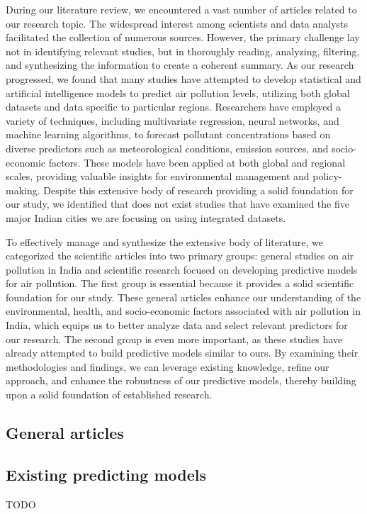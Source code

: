 \documentclass[twoside,11pt]{article}
\begin{document}
During our literature review, we encountered a vast number of articles related to our research topic. The widespread interest among scientists and data analysts facilitated the collection of numerous sources. However, the primary challenge lay not in identifying relevant studies, but in thoroughly reading, analyzing, filtering, and synthesizing the information to create a coherent summary. As our research progressed, we found that many studies have attempted to develop statistical and artificial intelligence models to predict air pollution levels, utilizing both global datasets and data specific to particular regions. Researchers have employed a variety of techniques, including multivariate regression, neural networks, and machine learning algorithms, to forecast pollutant concentrations based on diverse predictors such as meteorological conditions, emission sources, and socio-economic factors. These models have been applied at both global and regional scales, providing valuable insights for environmental management and policy-making. Despite this extensive body of research providing a solid foundation for our study, we identified that does not exist studies that have examined the five major Indian cities we are focusing on using integrated datasets.

To effectively manage and synthesize the extensive body of literature, we categorized the scientific articles into two primary groups: general studies on air pollution in India and scientific research focused on developing predictive models for air pollution. The first group is essential because it provides a solid scientific foundation for our study. These general articles enhance our understanding of the environmental, health, and socio-economic factors associated with air pollution in India, which equips us to better analyze data and select relevant predictors for our research. The second group is even more important, as these studies have already attempted to build predictive models similar to ours. By examining their methodologies and findings, we can leverage existing knowledge, refine our approach, and enhance the robustness of our predictive models, thereby building upon a solid foundation of established research.

\subsection{General articles}


\subsection{Existing predicting models}
TODO
\end{document}
